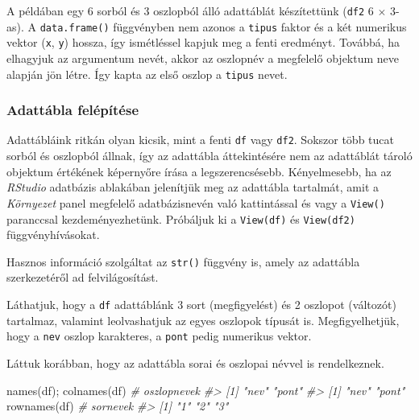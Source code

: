 \documentclass[
]{book}
\newenvironment{Shaded}{\begin{snugshade}}{\end{snugshade}}
\newcommand{\CommentTok}[1]{\textcolor[rgb]{0.56,0.35,0.01}{\textit{#1}}}
\newcommand{\FunctionTok}[1]{\textcolor[rgb]{0.00,0.00,0.00}{#1}}
\newcommand{\NormalTok}[1]{#1}
\begin{document}
A példában egy 6 sorból és 3 oszlopból álló adattáblát készítettünk (\texttt{df2} 6 \(\times\) 3-as). A \texttt{data.frame()} függvényben nem azonos a \texttt{tipus} faktor és a két numerikus vektor (\texttt{x}, \texttt{y}) hossza, így ismétléssel kapjuk meg a fenti eredményt. Továbbá, ha elhagyjuk az argumentum nevét, akkor az oszlopnév a megfelelő objektum neve alapján jön létre. Így kapta az első oszlop a \texttt{tipus} nevet.

\hypertarget{adattuxe1bla-feluxe9puxedtuxe9se}{%
\subsubsection{Adattábla felépítése}\label{adattuxe1bla-feluxe9puxedtuxe9se}}

Adattábláink ritkán olyan kicsik, mint a fenti \texttt{df} vagy \texttt{df2}. Sokszor több tucat sorból és oszlopból állnak, így az adattábla áttekintésére nem az adattáblát tároló objektum értékének képernyőre írása a legszerencsésebb. Kényelmesebb, ha az \emph{RStudio} adatbázis ablakában jelenítjük meg az adattábla tartalmát, amit a \emph{Környezet} panel megfelelő adatbázisnevén való kattintással és vagy a \texttt{View()} paranccsal kezdeményezhetünk. Próbáljuk ki a \texttt{View(df)} és \texttt{View(df2)} függvényhívásokat.

Hasznos információ szolgáltat az \texttt{str()} függvény is, amely az adattábla szerkezetéről ad felvilágosítást.

\begin{Shaded}
\end{Shaded}

Láthatjuk, hogy a \texttt{df} adattáblánk 3 sort (megfigyelést) és 2 oszlopot (változót) tartalmaz, valamint leolvashatjuk az egyes oszlopok típusát is. Megfigyelhetjük, hogy a \texttt{nev} oszlop karakteres, a \texttt{pont} pedig numerikus vektor.

Láttuk korábban, hogy az adattábla sorai és oszlopai névvel is rendelkeznek.

\begin{Shaded}
\begin{Highlighting}[]
\FunctionTok{names}\NormalTok{(df); }\FunctionTok{colnames}\NormalTok{(df)  }\CommentTok{\# oszlopnevek}
\CommentTok{\#\textgreater{} [1] "nev"  "pont"}
\CommentTok{\#\textgreater{} [1] "nev"  "pont"}
\FunctionTok{rownames}\NormalTok{(df)             }\CommentTok{\# sornevek}
\CommentTok{\#\textgreater{} [1] "1" "2" "3"}
\end{Highlighting}
\end{Shaded}
\end{document}
